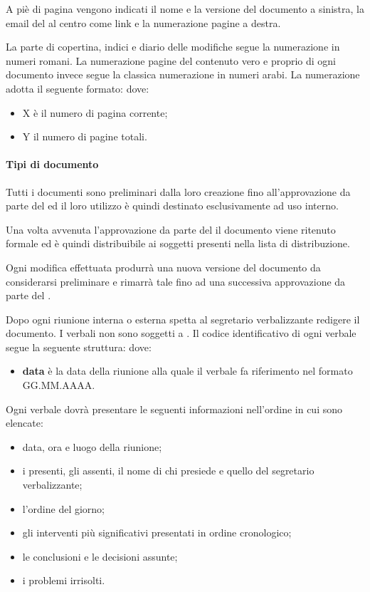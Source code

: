 \documentclass[a4paper, titlepage]{article}
\begin{document}
A piè di pagina vengono indicati il nome e la versione del documento a sinistra, la email del  al centro come link e la numerazione pagine a destra.

La parte di copertina, indici e diario delle modifiche segue la numerazione in numeri romani.
La numerazione pagine del contenuto vero e proprio di ogni documento invece segue la classica numerazione in numeri arabi.
La numerazione adotta il seguente formato:
dove:
\begin{itemize}
	\item X è il numero di pagina corrente;
	\item Y il numero di pagine totali.
\end{itemize}


\paragraph{Tipi di documento}

Tutti i documenti sono preliminari dalla loro creazione fino all'approvazione da parte del  ed il loro utilizzo è quindi destinato esclusivamente ad uso interno.

Una volta avvenuta l'approvazione da parte del  il documento viene ritenuto formale ed è quindi distribuibile ai soggetti presenti nella lista di distribuzione.

Ogni modifica effettuata produrrà una nuova versione del documento da considerarsi preliminare e rimarrà tale fino ad una successiva approvazione da parte del .

\GLOSSARIO

Dopo ogni riunione interna o esterna spetta al segretario verbalizzante redigere il documento. I verbali non sono soggetti a . Il codice identificativo di ogni verbale segue la seguente struttura: 
dove:
\begin{itemize}
	\item \textbf{data} è la data della riunione alla quale il verbale fa riferimento nel formato GG.MM.AAAA.
\end{itemize}

Ogni verbale dovrà presentare le seguenti informazioni nell'ordine in cui sono elencate:
\begin{itemize}
	\item data, ora e luogo della riunione;
	\item i presenti, gli assenti, il nome di chi presiede e quello del segretario verbalizzante;
	\item l'ordine del giorno;
	\item gli interventi più significativi presentati in ordine cronologico;
	\item le conclusioni e le decisioni assunte;
	\item i problemi irrisolti.
\end{itemize}
\end{document}
